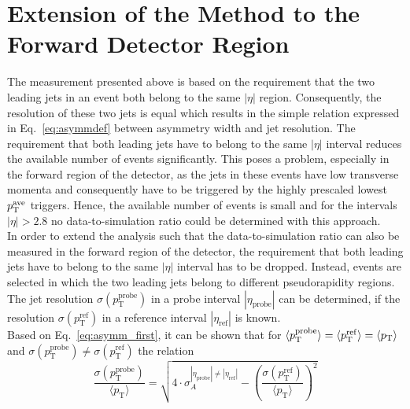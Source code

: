 \section{Extension of the Method to the Forward Detector Region}
\label{sec:jer_forward_extension}
The measurement presented above is based on the requirement that the two leading jets in an event both belong to the same $|\eta|$ region. Consequently, the resolution of these two jets is equal which results in the simple relation expressed in Eq.~\ref{eq:asymmdef} between asymmetry width and jet resolution. The requirement that both leading jets have to belong to the same $|\eta|$ interval reduces the available number of events significantly. This poses a problem, especially in the forward region of the detector, as the jets in these events have low transverse momenta and consequently have to be triggered by the highly prescaled lowest $p_{\text{T}}^\mathrm{ave}$ triggers. Hence, the available number of events is small and for the intervals $|\eta| > 2.8$ no data-to-simulation ratio could be determined with this approach. \\
In order to extend the analysis such that the data-to-simulation ratio can also be measured in the forward region of the detector, the requirement that both leading jets have to belong to the same $|\eta|$ interval has to be dropped. Instead, events are selected in which the two leading jets belong to different pseudorapidity regions. The jet resolution $\sigma (p_\mathrm{T}^{\mathrm{probe}})$ in a probe interval $|\eta_\mathrm{probe}|$ can be determined, if the resolution $\sigma (p_\mathrm{T}^{\mathrm{ref}})$ in a reference interval $|\eta_\mathrm{ref}|$ is known. \\
Based on Eq.~\ref{eq:asymm_first}, it can be shown that for $\langle p^\mathrm{probe}_\mathrm{T} \rangle = \langle p^\mathrm{ref}_\mathrm{T} \rangle = \langle p_{\text{T}} \rangle$ and $\sigma (p_\mathrm{T}^{\mathrm{probe}}) \neq \sigma (p_\mathrm{T}^{\mathrm{ref}})$ the relation
\begin{equation}
 \label{eq:asymm_forward}
  \frac{\sigma (p^\mathrm{probe}_\mathrm{T})}{\langle p_\mathrm{T} \rangle} = \sqrt{4 \cdot \sigma^{|\eta_{\mathrm{probe}}| \neq |\eta_{\mathrm{ref}}|}_{A} - \left(\frac{\sigma (p^\mathrm{ref}_\mathrm{T})}{\langle p_\mathrm{T} \rangle} \right)^2} 
 \end{equation}
